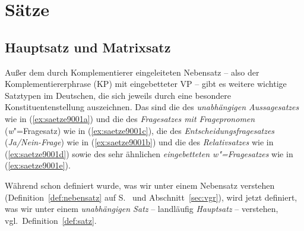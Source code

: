 \chapter{Sätze}

\label{sec:saetze}

\section{Hauptsatz und Matrixsatz}

\label{sec:hauptsatzmatrixsatz}

Außer dem durch Komplementierer eingeleiteten Nebensatz -- also der Komplementiererphrase (KP) mit eingebetteter VP -- gibt es weitere wichtige Satztypen im Deutschen, die sich jeweils durch eine besondere Konstituentenstellung auszeichnen.
Das sind die des \textit{unabhängigen Aussagesatzes} wie in (\ref{ex:saetze9001a}) und die des \textit{Fragesatzes mit Fragepronomen} (\textit{w}"=Fragesatz) wie in (\ref{ex:saetze9001c}), die des \textit{Entscheidungsfragesatzes} (\textit{Ja\slash Nein-Frage}) wie in (\ref{ex:saetze9001b}) und die des \textit{Relativsatzes} wie in (\ref{ex:saetze9001d}) sowie des sehr ähnlichen \textit{eingebetteten \textit{w}"=Fragesatzes} wie in (\ref{ex:saetze9001e}).

\begin{exe}
  \ex\label{ex:saetze9001}
  \begin{xlist}
  \end{xlist}
\end{exe}

Während schon definiert wurde, was wir unter einem Nebensatz verstehen (Definition~\ref{def:nebensatz} auf S.~\pageref{def:nebensatz} und Abschnitt~\ref{sec:vgr}), wird jetzt definiert, was wir unter einem \textit{unabhängigen Satz} -- landläufig \textit{Hauptsatz} -- verstehen, vgl.\ Definition~\ref{def:satz}.



